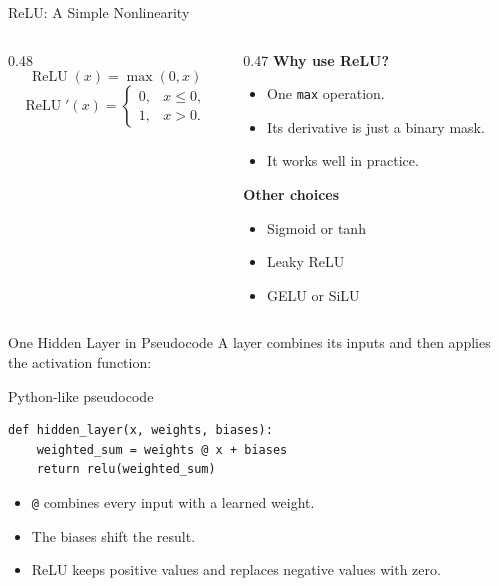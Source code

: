 \documentclass[aspectratio=169]{beamer}
\begin{document}
\begin{frame}{ReLU: A Simple Nonlinearity}
  \small
  \begin{columns}[T,onlytextwidth]
    \begin{column}{0.48\textwidth}
      \centering
      \vspace{2em}
      \large
      \[
        \operatorname{ReLU}(x)=\max(0,x)
      \]
      \[
        \operatorname{ReLU}'(x)=
        \begin{cases}
          0, & x\leq 0, \\
          1, & x>0.
        \end{cases}
      \]
    \end{column}

    \begin{column}{0.47\textwidth}
      \textbf{Why use ReLU?}
      \begin{itemize}
        \item One \texttt{max} operation.
        \item Its derivative is just a binary mask.
        \item It works well in practice.
      \end{itemize}

      \vspace{0.5em}
      \textbf{Other choices}
      \begin{itemize}
        \item Sigmoid or tanh
        \item Leaky ReLU
        \item GELU or SiLU
      \end{itemize}
    \end{column}
  \end{columns}
\end{frame}

\begin{frame}[fragile]{One Hidden Layer in Pseudocode}
  A layer combines its inputs and then applies the activation function:

  \begin{block}{Python-like pseudocode}
\begin{verbatim}
def hidden_layer(x, weights, biases):
    weighted_sum = weights @ x + biases
    return relu(weighted_sum)
\end{verbatim}
  \end{block}

  \begin{itemize}
    \item \texttt{@} combines every input with a learned weight.
    \item The biases shift the result.
    \item ReLU keeps positive values and replaces negative values with zero.
  \end{itemize}
\end{frame}
\end{document}
